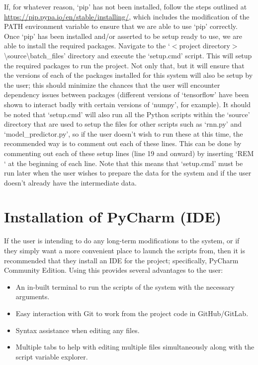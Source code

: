 \documentclass[12pt,twoside]{report}
\begin{document}
\quad If, for whatever reason, ‘pip’ has not been installed, follow the steps outlined at \url{https://pip.pypa.io/en/stable/installing/}, which includes the modification of the PATH environment variable to ensure that we are able to use ‘pip’ correctly.\\

\quad Once ‘pip’ has been installed and/or asserted to be setup ready to use, we are able to install the required packages. Navigate to the ‘$<$project directory$>$\textbackslash source\textbackslash batch\_files’ directory and execute the ‘setup.cmd’ script. This will setup the required packages to run the project. Not only that, but it will ensure that the versions of each of the packages installed for this system will also be setup by the user; this should minimize the chances that the user will encounter dependency issues between packages (different versions of ‘tensorflow’ have been shown to interact badly with certain versions of ‘numpy’, for example). It should be noted that ‘setup.cmd’ will also run all the Python scripts within the ‘source’ directory that are used to setup the files for other scripts such as ‘rnn.py’ and ‘model\_predictor.py’, so if the user doesn’t wish to run these at this time, the recommended way is to comment out each of these lines. This can be done by commenting out each of these setup lines (line 19 and onward) by inserting ‘REM ‘ at the beginning of each line. Note that this means that ‘setup.cmd’ must be run later when the user wishes to prepare the data for the system and if the user doesn’t already have the intermediate data.


\section{Installation of PyCharm (IDE)}

\quad If the user is intending to do any long-term modifications to the system, or if they simply want a more convenient place to launch the scripts from, then it is recommended that they install an IDE for the project; specifically, PyCharm Community Edition. Using this provides several advantages to the user:

\begin{itemize}
	\item An in-built terminal to run the scripts of the system with the necessary arguments.
	\item Easy interaction with Git to work from the project code in GitHub/GitLab.
	\item Syntax assistance when editing any files.
	\item Multiple tabs to help with editing multiple files simultaneously along with the script variable explorer.
\end{itemize}
\end{document}
